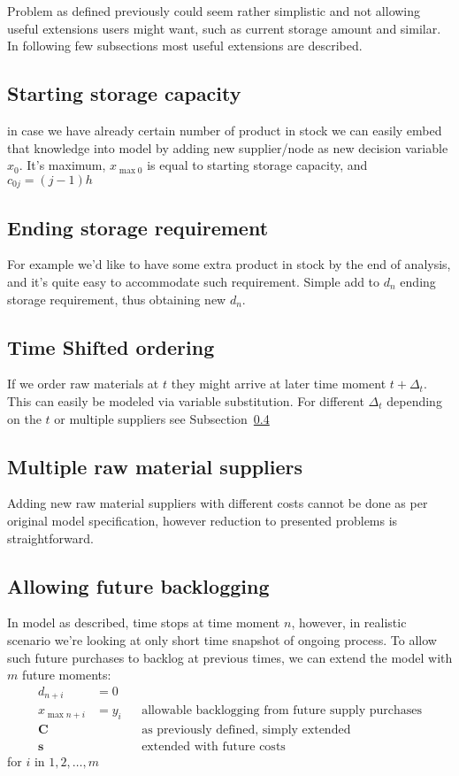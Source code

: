 Problem as defined previously could seem rather simplistic and not allowing useful extensions users might want, such as current storage amount and similar. In following few subsections most useful extensions are described.

\subsection{Starting storage capacity}
in case we have already certain number of product in stock we can easily embed that knowledge into model by adding new supplier/node as new decision variable $x_0$. It's maximum, $x_{\max0}$ is equal to starting storage capacity, and $c_{0j} = \left( j - 1 \right) h$

\subsection{Ending storage requirement}
\label{subs:Ending storage requirement}
For example we'd like to have some extra product in stock by the end of analysis, and it's quite easy to accommodate such requirement. Simple add to $d_n$ ending storage requirement, thus obtaining new $d_n$.

\subsection{Time Shifted ordering}
\label{subs:Time Shifted ordering}
If we order raw materials at $t$ they might arrive at later time moment $t+\Delta_t$. This can easily be modeled via variable substitution. For different $\Delta_t$ depending on the $t$ or multiple suppliers see Subsection~\ref{subs:Multiple raw material suppliers}

\subsection{Multiple raw material suppliers}
\label{subs:Multiple raw material suppliers}
Adding new raw material suppliers with different costs cannot be done as per original model specification, however reduction to presented problems is straightforward.

\subsection{Allowing future backlogging}
\label{subs:Allowing future backlogging}
In model as described, time stops at time moment $n$, however, in realistic scenario we're looking at only short time snapshot of ongoing process. To allow such future purchases to backlog at previous times, we can extend the model with $m$ future moments:
\begin{align*}
    d_{n+i} &= 0  && \\
    x_{\max{n+i}} &= y_i  && \text{allowable backlogging from future supply purchases}\\
    \mathbf{C}  & && \text{as previously defined, simply extended} \\
    \mathbf{s} &&& \text{extended with future costs}
\end{align*}
for $i$ in $1, 2, \dotsc, m$
